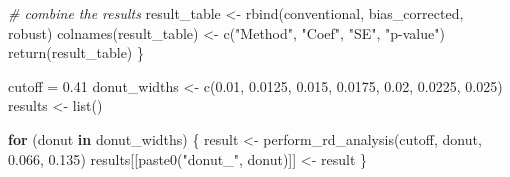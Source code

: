 \documentclass[
]{article}
\newenvironment{Shaded}{\begin{snugshade}}{\end{snugshade}}
\newcommand{\CommentTok}[1]{\textcolor[rgb]{0.56,0.35,0.01}{\textit{#1}}}
\newcommand{\ControlFlowTok}[1]{\textcolor[rgb]{0.13,0.29,0.53}{\textbf{#1}}}
\newcommand{\FloatTok}[1]{\textcolor[rgb]{0.00,0.00,0.81}{#1}}
\newcommand{\FunctionTok}[1]{\textcolor[rgb]{0.00,0.00,0.00}{#1}}
\newcommand{\NormalTok}[1]{#1}
\newcommand{\OtherTok}[1]{\textcolor[rgb]{0.56,0.35,0.01}{#1}}
\newcommand{\StringTok}[1]{\textcolor[rgb]{0.31,0.60,0.02}{#1}}
\begin{document}
\begin{Shaded}
\begin{Highlighting}[]
    \CommentTok{\# combine the results}
\NormalTok{    result\_table }\OtherTok{\textless{}{-}} \FunctionTok{rbind}\NormalTok{(conventional, bias\_corrected, robust)}
    \FunctionTok{colnames}\NormalTok{(result\_table) }\OtherTok{\textless{}{-}} \FunctionTok{c}\NormalTok{(}\StringTok{"Method"}\NormalTok{, }\StringTok{"Coef"}\NormalTok{, }\StringTok{"SE"}\NormalTok{, }\StringTok{"p{-}value"}\NormalTok{)}
    \FunctionTok{return}\NormalTok{(result\_table)}
\NormalTok{\}}

\NormalTok{cutoff }\OtherTok{=} \FloatTok{0.41}
\NormalTok{donut\_widths }\OtherTok{\textless{}{-}} \FunctionTok{c}\NormalTok{(}\FloatTok{0.01}\NormalTok{, }\FloatTok{0.0125}\NormalTok{, }\FloatTok{0.015}\NormalTok{, }\FloatTok{0.0175}\NormalTok{, }\FloatTok{0.02}\NormalTok{, }\FloatTok{0.0225}\NormalTok{, }\FloatTok{0.025}\NormalTok{)}
\NormalTok{results }\OtherTok{\textless{}{-}} \FunctionTok{list}\NormalTok{()}

\ControlFlowTok{for}\NormalTok{ (donut }\ControlFlowTok{in}\NormalTok{ donut\_widths) \{}
\NormalTok{    result }\OtherTok{\textless{}{-}} \FunctionTok{perform\_rd\_analysis}\NormalTok{(cutoff, donut, }\FloatTok{0.066}\NormalTok{, }\FloatTok{0.135}\NormalTok{)}
\NormalTok{    results[[}\FunctionTok{paste0}\NormalTok{(}\StringTok{"donut\_"}\NormalTok{, donut)]] }\OtherTok{\textless{}{-}}\NormalTok{ result}
\NormalTok{\}}
\end{Highlighting}
\end{Shaded}
\end{document}
